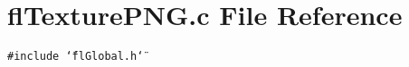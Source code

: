 \section{fl\-Texture\-PNG.c File Reference}
\label{flTexturePNG_8c}
{\tt \#include \char`\"{}fl\-Global.h\char`\"{}}\par
